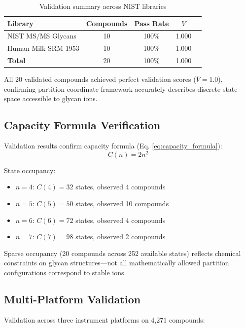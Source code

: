\documentclass[twocolumn,10pt]{revtex4-2}
\theoremstyle{definition}
\theoremstyle{remark}
\begin{document}
\begin{table}[h]
\centering
\caption{Validation summary across NIST libraries}
\label{tab:validation_summary}
\begin{tabular}{lcccc}
\toprule
\textbf{Library} & \textbf{Compounds} & \textbf{Pass Rate} & \textbf{$\bar{V}$} \\
\midrule
NIST MS/MS Glycans & 10 & 100\% & 1.000 \\
Human Milk SRM 1953 & 10 & 100\% & 1.000 \\
\midrule
\textbf{Total} & 20 & 100\% & 1.000 \\
\bottomrule
\end{tabular}
\end{table}

All 20 validated compounds achieved perfect validation scores ($\bar{V} = 1.0$), confirming partition coordinate framework accurately describes discrete state space accessible to glycan ions.

\subsection{Capacity Formula Verification}

Validation results confirm capacity formula (Eq. \ref{eq:capacity_formula}):
\begin{equation}
C(n) = 2n^2
\end{equation}

State occupancy:
\begin{itemize}
\item $n=4$: $C(4) = 32$ states, observed 4 compounds
\item $n=5$: $C(5) = 50$ states, observed 10 compounds
\item $n=6$: $C(6) = 72$ states, observed 4 compounds
\item $n=7$: $C(7) = 98$ states, observed 2 compounds
\end{itemize}

Sparse occupancy (20 compounds across 252 available states) reflects chemical constraints on glycan structures—not all mathematically allowed partition configurations correspond to stable ions.

\subsection{Multi-Platform Validation}

Validation across three instrument platforms on 4,271 compounds:
\end{document}
